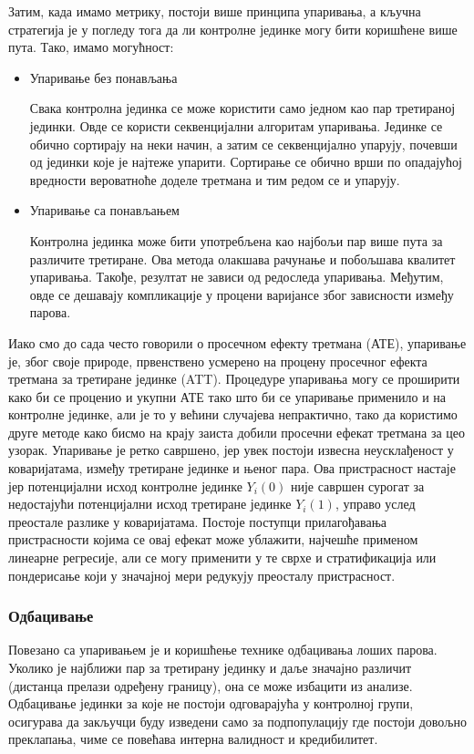 \documentclass[12pt, a4paper]{article}
\begin{document}
Затим, када имамо метрику, постоји више принципа упаривања, а кључна стратегија је у погледу тога да ли контролне јединке могу бити коришћене више пута. Тако, имамо могућност:
\begin{itemize}
  \item Упаривање без понављања

Свака контролна јединка се може користити само једном као пар третираној јединки. Овде се користи секвенцијални алгоритам упаривања. Јединке се обично сортирају на неки начин, а затим се секвенцијално упарују, почевши од јединки које је најтеже упарити. Сортирање се обично врши по опадајућој вредности вероватноће доделе третмана и тим редом се и упарују.
  \item Упаривање са понављањем

Контролна јединка може бити употребљена као најбољи пар више пута за различите третиране. Ова метода олакшава рачунање и побољшава квалитет упаривања. Такође, резултат не зависи од редоследа упаривања. Међутим, овде се дешавају компликације у процени варијансе због зависности између парова.
\end{itemize}
Иако смо до сада често говорили о просечном ефекту третмана (АТЕ), упаривање је, због своје природе, првенствено усмерено на процену просечног ефекта третмана за третиране јединке (ATT). Процедуре упаривања могу се проширити како би се проценио и укупни АТЕ тако што би се упаривање применило и на контролне јединке, али је то у већини случајева непрактично, тако да користимо друге методе како бисмо на крају заиста добили просечни ефекат третмана за цео узорак. Упаривање је ретко савршено, јер увек постоји извесна неусклађеност у коваријатама, између третиране јединке и њеног пара. Ова пристрасност настаје јер потенцијални исход контролне јединке $Y_i(0)$ није савршен сурогат за недостајући потенцијални исход третиране јединке $Y_i(1)$, управо услед преостале разлике у коваријатама. Постоје поступци прилагођавања пристрасности  којима се овај ефекат може ублажити, најчешће применом линеарне регресије, али се могу применити у те сврхе и стратификација или пондерисање који у значајној мери редукују преосталу пристрасност.

\subsubsection{Одбацивање}
Повезано са упаривањем је и коришћење технике одбацивања лоших парова. Уколико је најближи пар за третирану јединку и даље значајно различит (дистанца прелази одређену границу), она се може избацити из анализе. Одбацивање јединки за које не постоји одговарајућа у контролној групи, осигурава да закључци буду изведени само за подпопулацију где постоји довољно преклапања, чиме се повећава интерна валидност и кредибилитет.
\end{document}
